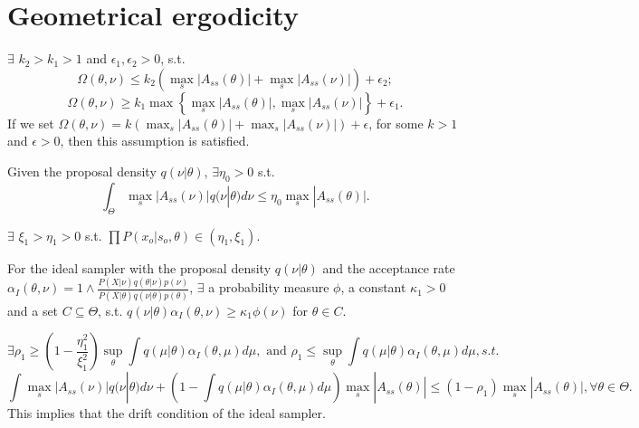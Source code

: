 \section{Geometrical ergodicity}
\begin{assumption}
$\exists$ $k_2 > k_1 > 1$ and $\epsilon_1, \epsilon_2 > 0$, s.t. 
$$\Omega(\theta, \nu) \leq k_2 \left(  \max_s|A_{ss}(\theta)| +  \max_s|A_{ss}(\nu)| \right) + \epsilon_2 ;$$
$$\Omega(\theta, \nu) \geq k_1 \max \left\lbrace \max_s|A_{ss}(\theta)|, \max_s|A_{ss}(\nu)| \right\rbrace + \epsilon_1.$$ 
If we set $\Omega(\theta, \nu) = k \left(  \max_s|A_{ss}(\theta)| +  \max_s|A_{ss}(\nu)| \right) + \epsilon$, for some $k > 1$ and $\epsilon > 0$, then this assumption is satisfied.
\end{assumption}

\begin{assumption}
Given the proposal density $q(\nu | \theta)$, $\exists \eta_0 > 0$ s.t. $$ \int_\Theta \max_s|A_{ss}(\nu)| q(\nu | \theta)d\nu \leq \eta_0 \max_s|A_{ss}(\theta)|.$$
\end{assumption}

\begin{assumption}
$\exists$ $ \xi_1 > \eta_1 > 0$ s.t. $\prod P(x_o | s_o, \theta) \in (\eta_1, \xi_1)$.
\end{assumption}

\begin{assumption}
For the ideal sampler with the proposal density $q(\nu| \theta)$ and the acceptance rate $\alpha_I(\theta, \nu) = 1 \wedge \frac{P(X | \nu)q(\theta| \nu)p(\nu)}{P(X | \theta)q(\nu| \theta)p(\theta)}$, $\exists$ a probability measure $\phi$, a constant $\kappa_1 > 0$ and a set $C \subseteq \Theta$, s.t. $q(\nu | \theta) \alpha_I(\theta, \nu) \geq \kappa_1 \phi(\nu)$ for $\theta \in C$. 
\end{assumption}

\begin{assumption}
$$\exists \rho_1 \geq \left(1 - \frac{\eta_1^2}{\xi_1^2}\right)\sup_\theta \int q(\mu| \theta)\alpha_I(\theta, \mu)d\mu , \text{ and } \rho_1 \leq \sup_\theta \int q(\mu| \theta)\alpha_I(\theta, \mu)d\mu, s.t.$$
$$\int \max_s |A_{ss}(\nu)|q(\nu | \theta)d\nu + \left(1 - \int q(\mu | \theta)\alpha_I(\theta, \mu)d\mu\right)\max_s |A_{ss}(\theta)| \leq (1 - \rho_1) \max_s |A_{ss}(\theta)|, \forall \theta \in \Theta.$$
This implies that the drift condition of the ideal sampler.
\end{assumption}

